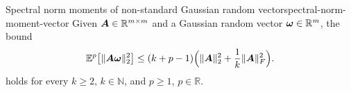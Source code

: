 \begin{lemma}{Spectral norm moments of non-standard Gaussian random vector}{spectral-norm-moment-vector}
    Given $\boldsymbol{A} \in \mathbb{R}^{m \times m}$ and a Gaussian random vector $\boldsymbol{\omega} \in \mathbb{R}^{m}$, the bound
    \[
        \mathbb{E}^{p}\big[ \lVert \boldsymbol{A} \boldsymbol{\omega} \rVert _2^2 \big]
        \leq  (k + p - 1) \Big( \lVert \boldsymbol{A} \rVert _2^2 + \frac{1}{k} \lVert \boldsymbol{A} \rVert _F^2 \Big).
    \]
    holds for every $k \ge 2$, $k\in \mathbb{N}$, and $p \ge 1$, $p\in \mathbb R$.
\end{lemma}%
